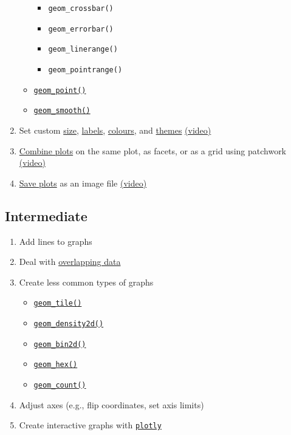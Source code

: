 \documentclass[
  oneside]{book}
\providecommand{\tightlist}{%
  \setlength{\itemsep}{0pt}\setlength{\parskip}{0pt}}
\begin{document}
\begin{enumerate}
\begin{itemize}
    \begin{itemize}
    \tightlist
    \item
      \texttt{geom\_crossbar()}
    \item
      \texttt{geom\_errorbar()}
    \item
      \texttt{geom\_linerange()}
    \item
      \texttt{geom\_pointrange()}
    \end{itemize}
  \item
    \protect\hyperlink{geom_point}{\texttt{geom\_point()}}
  \item
    \protect\hyperlink{geom_smooth}{\texttt{geom\_smooth()}}
  \end{itemize}
\item
  Set custom \protect\hyperlink{custom-size}{size},
  \protect\hyperlink{custom-labels}{labels},
  \protect\hyperlink{custom-colours}{colours}, and
  \protect\hyperlink{themes}{themes} \href{https://youtu.be/6pHuCbOh86s}{(video)}
\item
  \href{combo_plots}{Combine plots} on the same plot, as facets, or as a grid using patchwork \href{https://youtu.be/AnqlfuU-VZk}{(video)}
\item
  \protect\hyperlink{ggsave}{Save plots} as an image file \href{https://youtu.be/f1Y53mjEli0}{(video)}
\end{enumerate}

\hypertarget{intermediate-1}{%
\subsection*{Intermediate}\label{intermediate-1}}

\begin{enumerate}
\def\labelenumi{\arabic{enumi}.}
\setcounter{enumi}{5}
\tightlist
\item
  Add lines to graphs
\item
  Deal with \protect\hyperlink{overlap}{overlapping data}
\item
  Create less common types of graphs

  \begin{itemize}
  \tightlist
  \item
    \protect\hyperlink{geom_tile}{\texttt{geom\_tile()}}
  \item
    \protect\hyperlink{geom_density2d}{\texttt{geom\_density2d()}}
  \item
    \protect\hyperlink{geom_bin2d}{\texttt{geom\_bin2d()}}
  \item
    \protect\hyperlink{geom_hex}{\texttt{geom\_hex()}}
  \item
    \protect\hyperlink{geom_count}{\texttt{geom\_count()}}
  \end{itemize}
\item
  Adjust axes (e.g., flip coordinates, set axis limits)
\item
  Create interactive graphs with \protect\hyperlink{plotly}{\texttt{plotly}}
\end{enumerate}
\end{document}
